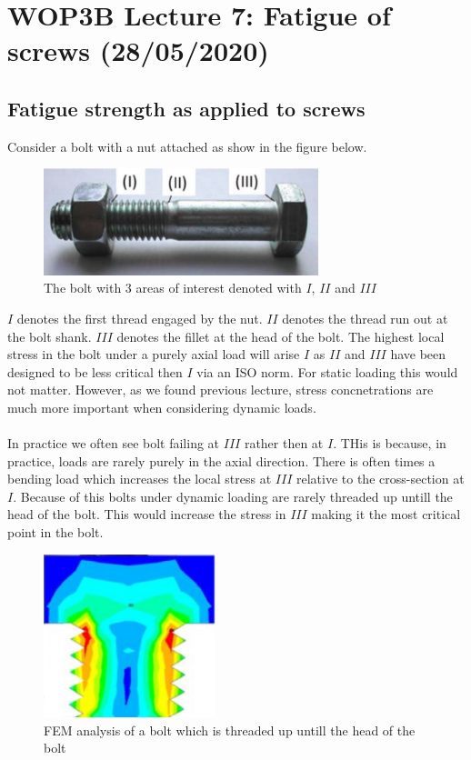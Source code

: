 \documentclass[11pt, a4paper]{article}
\begin{document}
\setcounter{equation}{0}
\setcounter{section}{6}

\section{WOP3B Lecture 7: Fatigue of screws (28/05/2020)}

\subsection{Fatigue strength as applied to screws}
Consider a bolt with a nut attached as show in the figure below.
\begin{figure}[H]
  \centerline{\includegraphics[width=80mm]{images/Bolt.png}}
  \caption{The bolt with 3 areas of interest denoted with $I$, $II$ and $III$}
\end{figure}
$I$ denotes the first thread engaged by the nut. $II$ denotes the thread run out at the bolt shank. $III$ denotes the fillet at the head of the bolt. The highest local stress in the bolt under a purely axial load will arise $I$ as $II$ and $III$ have been designed to be less critical then $I$ via an ISO norm. For static loading this would not matter. However, as we found previous lecture, stress concnetrations are much more important when considering dynamic loads.\\
\\
In practice we often see bolt failing at $III$ rather then at $I$. THis is because, in practice, loads are rarely purely in the axial direction. There is often times a bending load which increases the local stress at $III$ relative to the cross-section at $I$. Because of this bolts under dynamic loading are rarely threaded up untill the head of the bolt. This would increase the stress in $III$ making it the most critical point in the bolt.
\begin{figure}[h]
  \centerline{\includegraphics[width=50mm]{images/FEM.png}}
  \caption{FEM analysis of a bolt which is threaded up untill the head of the bolt}
\end{figure}
\end{document}
